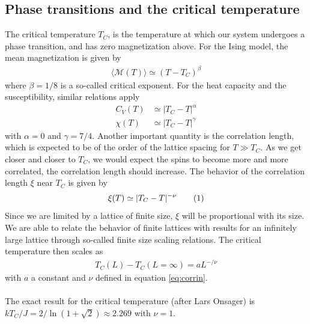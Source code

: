 \documentclass{article}
\newcommand\numberthis{\addtocounter{equation}{1}\tag{\theequation}}
\begin{document}
\subsection{Phase transitions and the critical temperature}
The critical temperature $T_C$, is the temperature at which our system undergoes a phase transition, and has zero magnetization above. For the Ising model, the mean magnetization is given by
\begin{align*}
\langle \mathcal{M}(T)\rangle \simeq (T-T_C)^{\beta}
\end{align*}
where $\beta = 1/8$ is a so-called critical exponent. For the heat capacity and the susceptibility, similar relations apply
\begin{align*}
  C_V(T) &\simeq |T_C-T|^{\alpha}\\
  \chi(T)&\simeq |T_C-T|^{\gamma}
\end{align*}
with $\alpha = 0$ and $\gamma = 7/4$. Another important quantity is the correlation length, which is expected to be of the order of the lattice spacing for  $T\gg T_C$. As we get closer and closer to $T_C$, we would expect the spins to become more and more correlated, the correlation length should increase. The behavior of the correlation length $\xi$ near $T_C$ is given by
\begin{align*}
\xi(T) \simeq |T_C-T|^{-\nu}\numberthis\label{eq:corrin}
\end{align*}
Since we are limited by a lattice of finite size, $\xi$ will be proportional with its size. We are able to relate the behavior of finite lattices with results for an infinitely large lattice through so-called finite size scaling relations. The critical temperature then scales as
\begin{align*}
  T_C(L) -T_C(L=\infty) = aL^{-/\nu}
\end{align*}
with $a$ a constant and $\nu$ defined in equation \eqref{eq:corrin}.\\\\
The exact result for the critical temperature (after Lars Onsager) is $kT_C/J = 2/\ln(1+\sqrt{2})\approx 2.269$ with $\nu = 1$. \cite{cite:lars_onsager}
\end{document}
